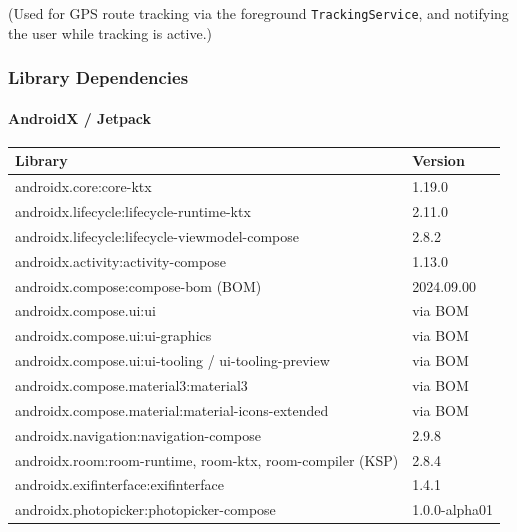 \documentclass{article}
\begin{document}
                    (Used for GPS route tracking via the foreground \texttt{TrackingService}, and notifying the user while tracking is active.)

                    \subsubsection*{Library Dependencies}

                     \paragraph{AndroidX / Jetpack}

                        \begin{center}
                            \begin{tabular}{p{7cm} p{4cm}}
                            \toprule
                            \textbf{Library} & \textbf{Version} \\ \midrule
                                androidx.core:core-ktx & 1.19.0 \\ \addlinespace
                                androidx.lifecycle:lifecycle-runtime-ktx & 2.11.0 \\ \addlinespace
                                androidx.lifecycle:lifecycle-viewmodel-compose & 2.8.2 \\ \addlinespace
                                androidx.activity:activity-compose & 1.13.0 \\ \addlinespace
                                androidx.compose:compose-bom (BOM) & 2024.09.00 \\ \addlinespace
                                androidx.compose.ui:ui & via BOM \\ \addlinespace
                                androidx.compose.ui:ui-graphics & via BOM \\ \addlinespace
                                androidx.compose.ui:ui-tooling / ui-tooling-preview & via BOM \\ \addlinespace
                                androidx.compose.material3:material3 & via BOM \\ \addlinespace
                                androidx.compose.material:material-icons-extended & via BOM \\ \addlinespace
                                androidx.navigation:navigation-compose & 2.9.8 \\ \addlinespace
                                androidx.room:room-runtime, room-ktx, room-compiler (KSP) & 2.8.4 \\ \addlinespace
                                androidx.exifinterface:exifinterface & 1.4.1 \\ \addlinespace
                                androidx.photopicker:photopicker-compose & 1.0.0-alpha01 \\ \bottomrule
                            \end{tabular}
                        \end{center}
\end{document}
